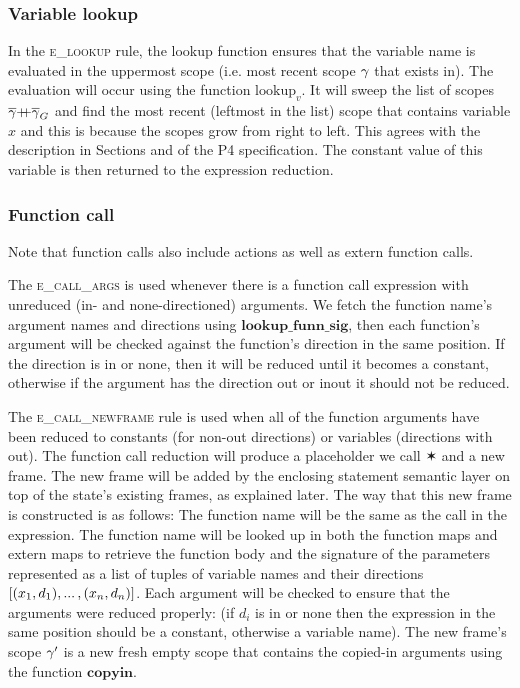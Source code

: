 \documentclass[UTF8]{article}
\begin{document}
\subsubsection*{Variable lookup}
In the \textsc{e\_lookup} rule, the lookup function ensures that the variable name \vn{} is evaluated in the uppermost scope (i.e. most recent scope $\gamma$ that \vn{} exists in). The evaluation will occur using the function $\mathrm{lookup}_v$. It will sweep the list of scopes $\overline{\gamma} {+}\mspace{-8mu}{+} \overline{\gamma}_G$ and find the most recent (leftmost in the list) scope that contains variable $x$ and this is because the scopes grow from right to left. This agrees with the description in Sections  and  of the P4 specification. The constant value of this variable is then returned to the expression reduction.

\begin{figure}[ht!]
    \ottusedrule{\ottdruleeXXlookup{}} 
\end{figure}



\subsubsection*{Function call}
Note that function calls also include actions as well as extern function calls.

The \textsc{e\_call\_args} is used whenever there is a function call expression with unreduced (in- and none-directioned) arguments. We fetch the function name's argument names and directions using $\mathbf{lookup\_funn\_sig}$, then each function's argument will be checked against the function's direction in the same position. If the direction is in or none, then it will be reduced until it becomes a constant, otherwise if the argument has the direction out or inout it should not be reduced.

The \textsc{e\_call\_newframe} rule is used when all of the function arguments have been reduced to constants (for non-out directions) or variables (directions with out). The function call reduction will produce a placeholder we call $\varstar$ and a new frame. The new frame will be added by the enclosing statement semantic layer on top of the state's existing frames, as explained later. 
The way that this new frame is constructed is as follows: The function name \funn{} will be the same as the call in the expression. The function name \funn{} will be looked up in both the function maps and extern maps to retrieve the function body \stmt{} and the signature of the parameters represented as a list of tuples of variable names and their directions $ [(x{}_1, d_1) , ... \, , (x{}_n, d_n) ] $. Each argument will be checked to ensure that the arguments were reduced properly: (if $d_i$ is in or none then the expression in the same position should be a constant, otherwise a variable name). The new frame's scope $\gamma'$ is a new fresh empty scope that contains the copied-in arguments using the function $\mathbf{copyin}$.
\end{document}
